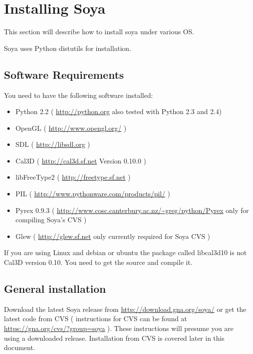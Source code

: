 \section{Installing Soya}
This section will describe how to install soya under various OS.

Soya uses Python distutils for installation.

\begin{seealso}
\end{seealso}

\subsection{Software Requirements}

You need to have the following software installed:

\begin{itemize}
  \item Python 2.2 ( \url{http://python.org} also tested with Python 2.3 and 2.4)
  \item OpenGL ( \url{http://www.opengl.org/} )
  \item SDL ( \url{http://libsdl.org} )
  \item Cal3D ( \url{http://cal3d.sf.net} Version 0.10.0 )
  \item libFreeType2 ( \url{http://freetype.sf.net} )
  \item PIL ( \url{http://www.pythonware.com/products/pil/} )
  \item Pyrex 0.9.3 ( \url{http://www.cosc.canterbury.ac.nz/~greg/python/Pyrex} only for compiling Soya's CVS )
  \item Glew ( \url{http://glew.sf.net} only currently required for Soya CVS )
\end{itemize}

\begin{notice}
If you are using Linux and debian or ubuntu the package called libcal3d10 is not 
Cal3D version 0.10. You need to get the source and compile it. 
\end{notice}

\subsection{General installation}
Download the latest Soya release from \url{http://download.gna.org/soya/} or 
get the latest code from CVS ( instructions for CVS can be found at 
\url{https://gna.org/cvs/?group=soya} ). These instructions will presume 
you are using a downloaded release. Installation from CVS is covered later in this 
document. 

